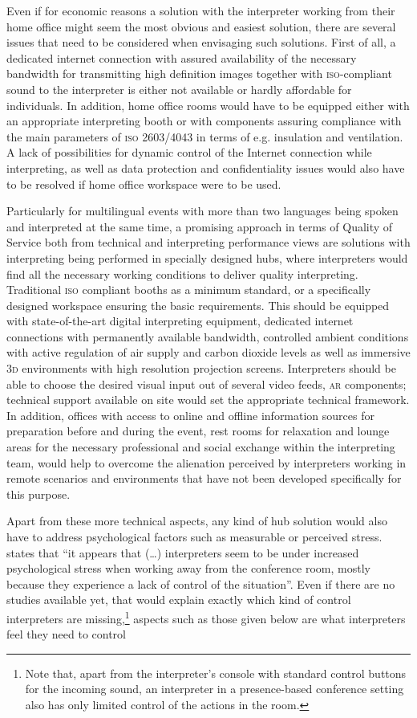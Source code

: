 \documentclass[output=paper]{langsci/langscibook}
\begin{document}
Even if for economic reasons a solution with the interpreter working from their home office might seem the most obvious and easiest solution, there are several issues that need to be considered when envisaging such solutions. First of all, a dedicated internet connection with assured availability of the necessary bandwidth for transmitting high definition images together with \textsc{iso}-compliant sound to the interpreter is either not available or hardly affordable for individuals. In addition, home office rooms would have to be equipped either with an appropriate interpreting booth or with components assuring compliance with the main parameters of \textsc{iso 2603/4043} in terms of e.g. insulation and ventilation. A lack of possibilities for dynamic control of the Internet connection while interpreting, as well as data protection and confidentiality issues would also have to be resolved if home office workspace were to be used.

Particularly for multilingual events with more than two languages being spoken and interpreted at the same time, a promising approach in terms of Quality of Service both from technical and interpreting performance views are solutions with interpreting being performed in specially designed hubs, where interpreters would find all the necessary working conditions to deliver quality interpreting. Traditional \textsc{iso} compliant booths as a minimum standard, or a specifically designed workspace ensuring the basic requirements. This should be equipped with state-of-the-art digital interpreting equipment, dedicated internet connections with permanently available bandwidth, controlled ambient conditions with active regulation of air supply and carbon dioxide levels as well as immersive \textsc{3d} environments with high resolution projection screens. Interpreters should be able to choose the desired visual input out of several video feeds, \textsc{ar} components; technical support available on site would set the appropriate technical framework. In addition, offices with access to online and offline information sources for preparation before and during the event, rest rooms for relaxation and lounge areas for the necessary professional and social exchange within the interpreting team, would help to overcome the alienation perceived by interpreters working in remote scenarios and environments that have not been developed specifically for this purpose. 

\largerpage
Apart from these more technical aspects, any kind of hub solution would also have to address psychological factors such as measurable or perceived stress. \citet[15]{Moser-Mercer2005} states that “it appears that (…) interpreters seem to be under increased psychological stress when working away from the conference room, mostly because they experience a lack of control of the situation”. Even if there are no studies available yet, that would explain exactly which kind of control interpreters are missing,\footnote{Note that, apart from the interpreter’s console with standard control buttons for the incoming sound, an interpreter in a presence-based conference setting also has only limited control of the actions in the room.} aspects such as those given below are what interpreters feel they need to control
\end{document}
